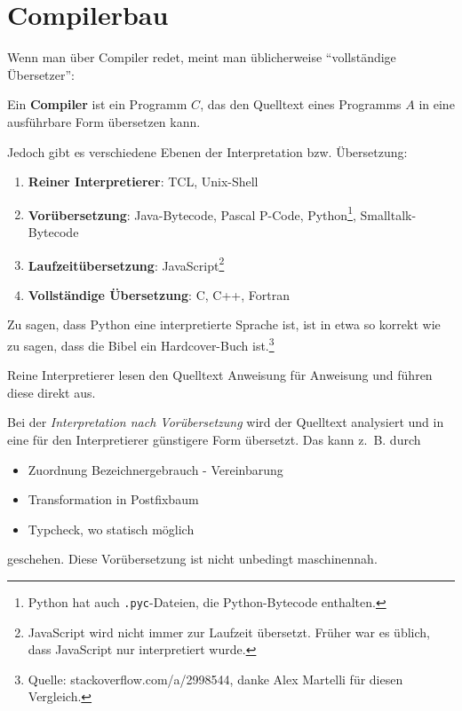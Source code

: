 \chapter{Compilerbau}

Wenn man über Compiler redet, meint man üblicherweise \enquote{vollständige Übersetzer}:

\begin{definition}%
	Ein \textbf{Compiler} ist ein Programm $C$, das den Quelltext eines Programms
	$A$ in eine ausführbare Form übersetzen kann.
\end{definition}

Jedoch gibt es verschiedene Ebenen der Interpretation bzw. Übersetzung:
\begin{enumerate}
	\item \textbf{Reiner Interpretierer}: TCL, Unix-Shell
	\item \textbf{Vorübersetzung}: Java-Bytecode, Pascal P-Code, Python\footnote{Python hat auch \texttt{.pyc}-Dateien, die Python-Bytecode enthalten.}, Smalltalk-Bytecode
	\item \textbf{Laufzeitübersetzung}: JavaScript\footnote{JavaScript wird nicht immer zur Laufzeit übersetzt. Früher war es üblich, dass JavaScript nur interpretiert wurde.}
	\item \textbf{Vollständige Übersetzung}: C, C++, Fortran
\end{enumerate}

Zu sagen, dass Python eine interpretierte Sprache ist, ist in etwa so korrekt 
wie zu sagen, dass die Bibel ein Hardcover-Buch ist.\footnote{Quelle: stackoverflow.com/a/2998544, danke Alex Martelli für diesen Vergleich.}

Reine Interpretierer lesen den Quelltext Anweisung für Anweisung und führen 
diese direkt aus.


Bei der \textit{Interpretation nach Vorübersetzung} wird der Quelltext analysiert
und in eine für den Interpretierer günstigere Form übersetzt. Das kann z.~B.
durch
\begin{itemize}
	\item Zuordnung Bezeichnergebrauch - Vereinbarung
	\item Transformation in Postfixbaum
	\item Typcheck, wo statisch möglich
\end{itemize}
geschehen. Diese Vorübersetzung ist nicht unbedingt maschinennah.

